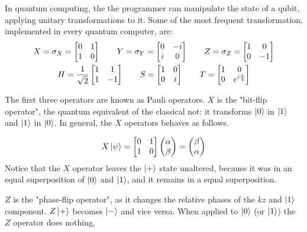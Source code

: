 In quantum computing, the the programmer can manipulate the state of a qubit, applying unitary transformations to it. Some of the most frequent transformation, implemented in every quantum computer, are:
\begin{gather*}
	X = \sigma_X = \begin{bmatrix}
	0 & 1 \\
	1 & 0
	\end{bmatrix} \qquad
	Y = \sigma_Y = \begin{bmatrix}
	0 & -i \\
	i & 0
	\end{bmatrix} \qquad
	Z = \sigma_Z = \begin{bmatrix}
	1 & 0 \\
	0 & -1
	\end{bmatrix} \\ 
	H = \frac{1}{\sqrt{2}}\begin{bmatrix}
	1 & 1 \\
	1 & -1
	\end{bmatrix} \qquad
 	S = \begin{bmatrix}
	1 & 0 \\
	0 & i
	\end{bmatrix}\qquad
	T = \begin{bmatrix}
	1 & 0 \\
	0 & e^{i\frac{\pi}{4}}
	\end{bmatrix} 
\end{gather*}

The first three operators are known as Pauli operators. $X$ is the "bit-flip operator", the quantum equivalent of the classical not: it transforms $\ket{0}$ in $\ket{1}$ and $\ket{1}$ in $\ket{0}$. In general, the $X$ operators behaves as follows.

\[ X\ket{\psi} = \begin{bmatrix}
	0 & 1 \\
	1 & 0
	\end{bmatrix} 
	\begin{pmatrix}
	\alpha \\
	\beta	
	\end{pmatrix} = 
	\begin{pmatrix}
	\beta \\
	\alpha	
	\end{pmatrix}
\] 
Notice that the $X$ operator leaves the $\ket{+}$ state unaltered, because it was in an equal superposition of $\ket{0}$ and $\ket{1}$, and it remains in a equal superposition.


$Z$ is the "phase-flip operator", as it changes the relative phases of the $kz$ and $\ket{1}$ component. $Z \ket{+}$ becomes $\ket{-}$ and vice versa. When applied to $\ket{0}$ (or $\ket{1}$) the $Z$ operator does nothing, 

